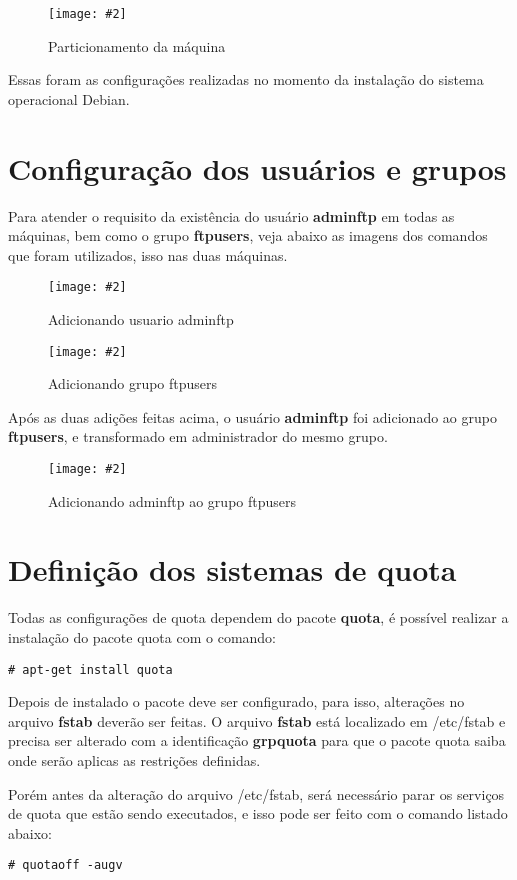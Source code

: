 \documentclass[
	12pt,				%
	openright,			%
	twoside,			%
	openany,			%
	a4paper,			%
	chapter=TITLE,		%
	section=TITLE,		%
	subsection=TITLE,	%
	subsubsection=TITLE,%
	english,
	brazil				%
]{abntex2}
\newcommand{\includeImage}[3] {

\begin{figure}[H]
 	 \centering
  		\texttt{[image: \#2]}
  	\caption{#3}
\end{figure}

}
\begin{document}
\includeImage{0.5}{../imgs/particionamento.png}{Particionamento da máquina}

Essas foram as configurações realizadas no momento da instalação do sistema operacional Debian.

\section{Configuração dos usuários e grupos}

Para atender o requisito da existência do usuário \textbf{adminftp} em todas as máquinas, bem como o grupo \textbf{ftpusers}, veja abaixo as imagens dos comandos que foram utilizados, isso nas duas máquinas.

\includeImage{0.5}{../imgs/2_configuracao_usuarios/1_adduser_adminftp.png}{Adicionando usuario adminftp}

\includeImage{0.5}{../imgs/2_configuracao_usuarios/2-addgroup_ftpusers.png}{Adicionando grupo ftpusers}

Após as duas adições feitas acima, o usuário \textbf{adminftp} foi adicionado ao grupo \textbf{ftpusers}, e transformado em administrador do mesmo grupo.

\includeImage{0.5}{../imgs/2_configuracao_usuarios/3-gpasswd_a_adminftp_ftpusers.png}{Adicionando adminftp ao grupo ftpusers}

\section{Definição dos sistemas de quota}

Todas as configurações de quota dependem do pacote \textbf{quota}, é possível realizar a instalação do pacote quota com o comando:

\begin{lstlisting}
# apt-get install quota
\end{lstlisting}


Depois de instalado o pacote deve ser configurado, para isso, alterações no arquivo \textbf{fstab} deverão ser feitas.
O arquivo \textbf{fstab} está localizado em /etc/fstab e precisa ser alterado com a identificação \textbf{grpquota} para que o pacote quota saiba onde serão aplicas as restrições definidas.

Porém antes da alteração do arquivo /etc/fstab, será necessário parar os serviços de quota que estão sendo executados, e isso pode ser feito com o comando listado abaixo:

\begin{lstlisting}
# quotaoff -augv
\end{lstlisting}
\end{document}
